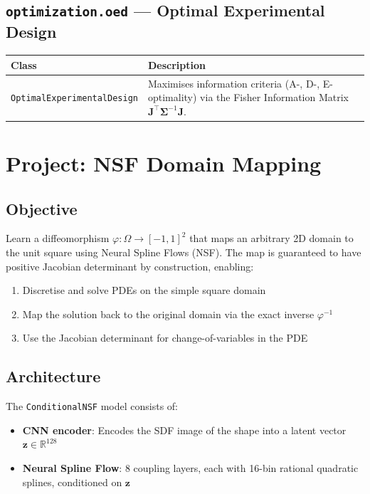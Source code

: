 \documentclass[11pt,a4paper]{report}
\begin{document}
\section{\texttt{optimization.oed} --- Optimal Experimental Design}

\begin{longtable}{lp{8cm}}
\toprule
\textbf{Class} & \textbf{Description} \\
\midrule
\texttt{OptimalExperimentalDesign} & Maximises information criteria (A-, D-, E-optimality) via the Fisher Information Matrix $\mathbf{J}^\top \boldsymbol{\Sigma}^{-1} \mathbf{J}$. \\
\bottomrule
\end{longtable}

\chapter{Project: NSF Domain Mapping}

\section{Objective}

Learn a diffeomorphism $\varphi: \Omega \to [-1,1]^2$ that maps an arbitrary 2D domain to the unit square using Neural Spline Flows (NSF). The map is guaranteed to have positive Jacobian determinant by construction, enabling:
\begin{enumerate}[leftmargin=2em]
    \item Discretise and solve PDEs on the simple square domain
    \item Map the solution back to the original domain via the exact inverse $\varphi^{-1}$
    \item Use the Jacobian determinant for change-of-variables in the PDE
\end{enumerate}

\section{Architecture}

The \texttt{ConditionalNSF} model consists of:
\begin{itemize}[leftmargin=2em]
    \item \textbf{CNN encoder}: Encodes the SDF image of the shape into a latent vector $\mathbf{z} \in \mathbb{R}^{128}$
    \item \textbf{Neural Spline Flow}: 8 coupling layers, each with 16-bin rational quadratic splines, conditioned on $\mathbf{z}$
\end{itemize}
\end{document}
